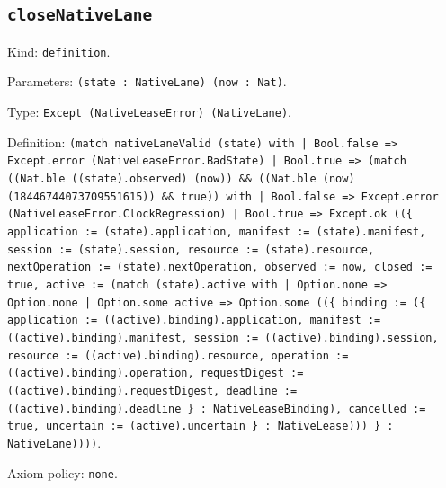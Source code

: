 \documentclass[11pt]{article}
\begin{document}
\subsection*{\texttt{closeNativeLane}}
\noindent Kind: \texttt{definition}.\par
\noindent Parameters: \texttt{(state : NativeLane) (now : Nat)}.\par
\noindent Type: \texttt{Except (NativeLeaseError) (NativeLane)}.\par
\noindent Definition: \texttt{(match nativeLaneValid (state) with | Bool.false => Except.error (NativeLeaseError.BadState) | Bool.true => (match ((Nat.ble ((state).observed) (now)) \&\& ((Nat.ble (now) (18446744073709551615)) \&\& true)) with | Bool.false => Except.error (NativeLeaseError.ClockRegression) | Bool.true => Except.ok ((\{ application := (state).application, manifest := (state).manifest, session := (state).session, resource := (state).resource, nextOperation := (state).nextOperation, observed := now, closed := true, active := (match (state).active with | Option.none => Option.none | Option.some active => Option.some ((\{ binding := (\{ application := ((active).binding).application, manifest := ((active).binding).manifest, session := ((active).binding).session, resource := ((active).binding).resource, operation := ((active).binding).operation, requestDigest := ((active).binding).requestDigest, deadline := ((active).binding).deadline \} : NativeLeaseBinding), cancelled := true, uncertain := (active).uncertain \} : NativeLease))) \} : NativeLane))))}.\par
\noindent Axiom policy: \texttt{none}.\par
\end{document}
